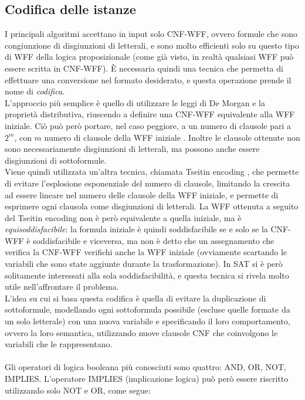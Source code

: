 \subsection{Codifica delle istanze}
I principali algoritmi accettano in input solo CNF-WFF, ovvero formule che sono congiunzione
di disgiunzioni di letterali, e sono molto efficienti solo su questo tipo di WFF della logica proposizionale
(come già visto, in realtà qualsiasi WFF può essere scritta in CNF-WFF).
È necessaria quindi una tecnica che permetta di effettuare una conversione nel formato desiderato,
e questa operazione prende il nome di \textit{codifica}.\\
L'approccio più semplice è quello di utilizzare le leggi di De Morgan
e la proprietà distributiva, riuscendo a definire una CNF-WFF equivalente alla WFF iniziale.
Ciò può però portare, nel caso peggiore, a un numero di clausole
pari a $2^m$, con $m$ numero di clausole della WFF iniziale \cite{encoding-lectures}.
Inoltre le clausole ottenute non sono necessariamente disgiunzioni di letterali, ma possono anche essere disgiunzioni di sottoformule.\\
Viene quindi utilizzata un'altra tecnica, chiamata Tseitin encoding \cite{tseitin},
che permette di evitare l'esplosione esponenziale del numero di clausole, limitando la crescita
ad essere lineare nel numero delle clausole della WFF iniziale, e permette di esprimere
ogni clausola come disgiunzioni di letterali.
La WFF ottenuta a seguito del Tseitin encoding non è però equivalente a quella iniziale, 
ma è \textit{equisoddisfacibile}: la formula iniziale è quindi soddisfacibile se e solo se la CNF-WFF
è soddisfacibile e viceversa, ma non è detto che un assegnamento che verifica la CNF-WFF verifichi
anche la WFF iniziale (ovviamente scartando le variabili che sono state aggiunte durante la trasformazione).
In SAT si è però solitamente interessati alla sola soddisfacibilità, e questa
tecnica si rivela molto utile nell'affrontare il problema.\\
L'idea su cui si basa questa codifica è quella di evitare la duplicazione di sottoformule,
modellando ogni sottoformula possibile (escluse quelle formate da un solo letterale) con una nuova variabile e specificando il loro comportamento,
ovvero la loro semantica, utilizzando nuove clausole CNF che coinvolgono le variabili che le rappresentano.\\
\\
Gli operatori di logica booleana più conosciuti sono quattro: AND, OR, NOT, IMPLIES.
L'operatore IMPLIES (implicazione logica) può però essere riscritto utilizzando solo NOT e OR, come segue:
